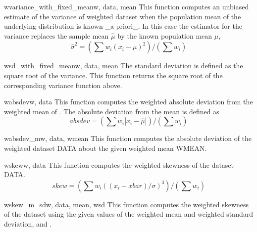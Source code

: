 \begin{funcdesc}{wvariance_with_fixed_mean}{w, data, mean}
   This function computes an unbiased estimate of the variance of weighted
   dataset  when the population mean  of the underlying
   distribution is known _a priori_.  In this case the estimator for the
   variance replaces the sample mean $\hat\mu$ by the known population mean
   $\mu$,
   \begin{equation}
      \hat\sigma^2 = (\sum w_i (x_i - \mu)^2) / (\sum w_i)
   \end{equation}
\end{funcdesc}

\begin{funcdesc}{wsd_with_fixed_mean}{w, data, mean}
   The standard deviation is defined as the square root of the variance.  This
   function returns the square root of the corresponding variance function
   above.
\end{funcdesc}

\begin{funcdesc}{wabsdev}{w, data}
   This function computes the weighted absolute deviation from the weighted
   mean of .  The absolute deviation from the mean is defined as
   \begin{equation}
      absdev = (\sum w_i |x_i - \hat\mu|) / (\sum w_i)
   \end{equation}
\end{funcdesc}

\begin{funcdesc}{wabsdev_m}{w, data, wmean}
   This function computes the absolute deviation of the weighted dataset DATA
   about the given weighted mean WMEAN.
\end{funcdesc}

\begin{funcdesc}{wskew}{w, data}
   This function computes the weighted skewness of the dataset DATA.
   \begin{equation}
      skew = (\sum w_i ((x_i - xbar)/\sigma)^3) / (\sum w_i)
   \end{equation}
\end{funcdesc}

\begin{funcdesc}{wskew_m_sd}{w, data, mean, wsd}
   This function computes the weighted skewness of the dataset  using
   the given values of the weighted mean and weighted standard deviation,
    and .
\end{funcdesc}

